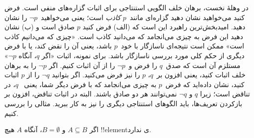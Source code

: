 \documentclass[../../../include/open-logic-section]{subfiles}
\begin{document}


در وهلهٔ نخست، برهان خلف الگویی استنتاجی برای اثبات گزاره‌های منفی
است. فرض کنید می‌خواهید نشان دهید گزاره‌ای مانند~$p$ \emph{کاذب} است؛
یعنی می‌خواهید~$\lnot p$ را نشان دهید. امیدبخش‌ترین راهبرد این است که
(الف) فرض کنید $p$ صادق است و (ب) نشان دهید این فرض به چیزی می‌انجامد
که می‌دانید کاذب است. «چیزی که می‌دانیم کاذب است» ممکن است نتیجه‌ای
ناسازگار با خود~$p$ باشد، یعنی آن را نقض کند، یا با فرض دیگری از حکم
کلی مورد بررسی ناسازگار باشد. برای نمونه، اثبات «اگر $q$، آنگاه
$\lnot p$» مستلزم آن است که صدق~$q$ را فرض و~$\lnot p$ را از آن اثبات
کنیم. اگر $\lnot p$ را به برهان خلف اثبات کنید، یعنی افزون بر~$q$،
$p$ را نیز فرض می‌کنید. اگر بتوانید $\lnot q$ را از $p$ اثبات کنید،
نشان داده‌اید که فرض~$p$ به چیزی می‌انجامد که با فرض دیگر شما، یعنی
~$q$، در تناقض است؛ زیرا $q$ و $\lnot q$ نمی‌توانند هر دو صادق باشند.
البته در اثبات تناقض، افزون بر بازکردن تعریف‌ها، باید الگوهای استنتاجی
دیگری را نیز به کار ببرید. مثالی را بررسی کنیم.

\begin{prop}
  اگر $A \subseteq B$ و $B = \emptyset$، آنگاه $A$ هیچ !!{element}ی ندارد.
\end{prop}
\end{document}
